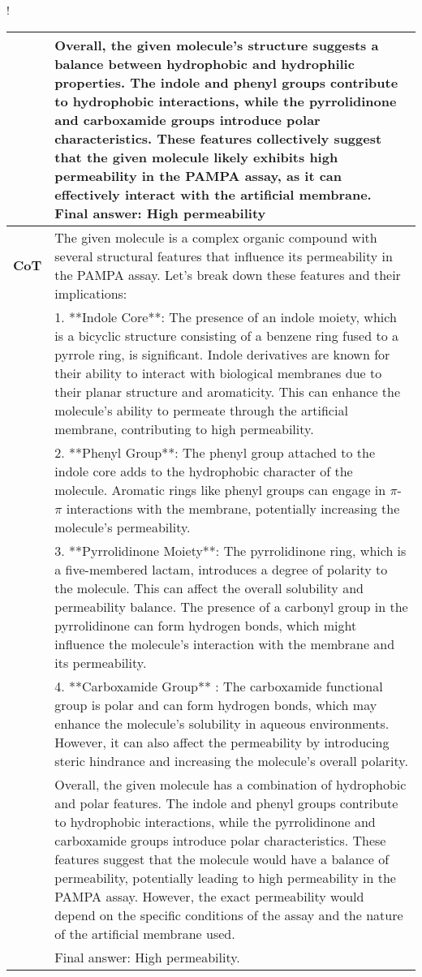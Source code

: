 \begin{table}[ht!]
\begin{resizebox}{\linewidth}{!}
{\begin{tabular}{p{1.2cm} p{18cm}}
& Overall, the given molecule's structure \textcolor{tabblue}{suggests a balance between hydrophobic and hydrophilic properties. The indole and phenyl groups contribute to hydrophobic interactions, while the pyrrolidinone and carboxamide groups introduce polar characteristics.} These features collectively suggest that the given molecule likely exhibits high permeability in the PAMPA assay, as it can effectively interact with the artificial membrane. \textcolor{tabblue}{Final answer: High permeability} \\
\midrule
\textbf{CoT} & The given molecule is a complex organic compound with several structural features that influence its permeability in the PAMPA assay. Let's break down these features and their implications: \\

& 1. **Indole Core**: The presence of an indole moiety, which is a bicyclic structure consisting of a benzene ring fused to a pyrrole ring, is significant. Indole derivatives are known for their ability to interact with biological membranes due to their planar structure and aromaticity. This can enhance the molecule's ability to permeate through the artificial membrane, contributing to high permeability. \\

& 2. **Phenyl Group**: The phenyl group attached to the indole core adds to the hydrophobic character of the molecule. Aromatic rings like phenyl groups can engage in $\pi$-$\pi$ interactions with the membrane, potentially increasing the molecule's permeability. \\

& 3. **Pyrrolidinone Moiety**: The pyrrolidinone ring, which is a five-membered lactam, introduces a degree of polarity to the molecule. This can affect the overall solubility and permeability balance. The presence of a carbonyl group in the pyrrolidinone can form hydrogen bonds, which might influence the molecule's interaction with the membrane and its permeability. \\

& 4. **Carboxamide Group** : The carboxamide functional group is polar and can form hydrogen bonds, which may enhance the molecule's solubility in aqueous environments. However, it can also affect the permeability by introducing steric hindrance and increasing the molecule's overall polarity. \\

& Overall, the given molecule has a combination of hydrophobic and polar features. The indole and phenyl groups contribute to hydrophobic interactions, while the pyrrolidinone and carboxamide groups introduce polar characteristics. These features suggest that the molecule would have a balance of permeability, potentially leading to high permeability in the PAMPA assay. However, the exact permeability would depend on the specific conditions of the assay and the nature of the artificial membrane used.  \\
& Final answer: High permeability.\\



\end{tabular}}
\end{resizebox}
\end{table}
